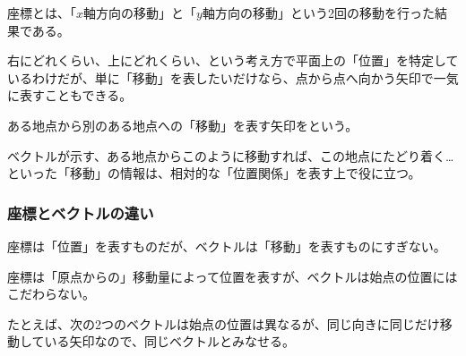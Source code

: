 \documentclass[../math-imaging]{subfiles}
\begin{document}
\br

座標とは、「$x$軸方向の移動」と「$y$軸方向の移動」という2回の移動を行った結果である。

右にどれくらい、上にどれくらい、という考え方で平面上の「位置」を特定しているわけだが、単に「移動」を表したいだけなら、点から点へ向かう矢印で一気に表すこともできる。

\br

ある地点から別のある地点への「移動」を表す矢印をという。

\br

ベクトルが示す、ある地点からこのように移動すれば、この地点にたどり着く…といった「移動」の情報は、相対的な「位置関係」を表す上で役に立つ。

\subsubsection{座標とベクトルの違い}

座標は「位置」を表すものだが、ベクトルは「移動」を表すものにすぎない。

座標は「原点からの」移動量によって位置を表すが、ベクトルは始点の位置にはこだわらない。

\br

たとえば、次の2つのベクトルは始点の位置は異なるが、同じ向きに同じだけ移動している矢印なので、同じベクトルとみなせる。

\begin{center}
\end{center}
\end{document}
